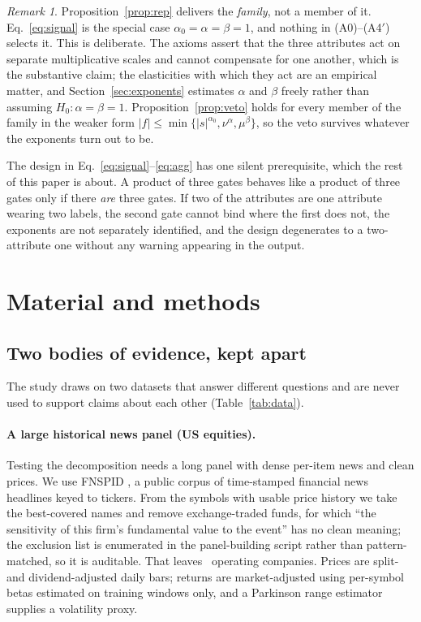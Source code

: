 \documentclass[preprint,12pt,authoryear]{elsarticle}
\theoremstyle{plain}
\theoremstyle{remark}
\newtheorem{remark}{Remark}
\begin{document}
\begin{remark}\label{rem:notpinned}
Proposition~\ref{prop:rep} delivers the \emph{family}, not a member of it.
Eq.~\eqref{eq:signal} is the special case $\alpha_0=\alpha=\beta=1$, and nothing
in (A0)--(A4$'$) selects it. This is deliberate. The axioms assert that the
three attributes act on separate multiplicative scales and cannot compensate for
one another, which is the substantive claim; the elasticities with which they
act are an empirical matter, and Section~\ref{sec:exponents} estimates $\alpha$
and $\beta$ freely rather than assuming $H_0\!:\alpha=\beta=1$.
Proposition~\ref{prop:veto} holds for every member of the family in the weaker
form $|f|\le\min\{|s|^{\alpha_0},\nu^{\alpha},\mu^{\beta}\}$, so the veto
survives whatever the exponents turn out to be.
\end{remark}

The design in Eq.~\eqref{eq:signal}--\eqref{eq:agg} has one silent
prerequisite, which the rest of this paper is about. A product of three gates
behaves like a product of three gates only if there \emph{are} three gates. If
two of the attributes are one attribute wearing two labels, the second gate
cannot bind where the first does not, the exponents are not separately
identified, and the design degenerates to a two-attribute one without any
warning appearing in the output.

\section{Material and methods}\label{sec:methods}

\subsection{Two bodies of evidence, kept apart}\label{sec:evidence}

The study draws on two datasets that answer different questions and are never
used to support claims about each other (Table~\ref{tab:data}).

\paragraph{A large historical news panel (US equities).} Testing the
decomposition needs a long panel with dense per-item news and clean prices. We
use FNSPID \citep{dong2024}, a public corpus of time-stamped financial news
headlines keyed to tickers. From the symbols with usable price history we take
the best-covered names and remove exchange-traded funds, for which ``the
sensitivity of this firm's fundamental value to the event'' has no clean
meaning; the exclusion list is enumerated in the panel-building script rather
than pattern-matched, so it is auditable. That leaves \NCompanies\ operating
companies. Prices are split- and dividend-adjusted daily bars; returns are
market-adjusted using per-symbol betas estimated on training windows only, and a
Parkinson range estimator \citep{parkinson1980} supplies a volatility proxy.
\end{document}

